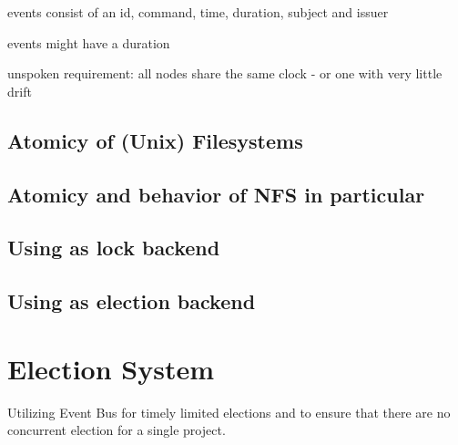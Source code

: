 events consist of an id, command, time, duration, subject and issuer

events might have a duration

unspoken requirement: all nodes share the same clock - or one with very little drift

\subsection{Atomicy of (Unix) Filesystems}

\subsection{Atomicy and behavior of NFS in particular}

\subsection{Using as lock backend}

\subsection{Using as election backend}



\section{Election System}

Utilizing Event Bus for timely limited elections and to ensure that there are no concurrent election for a single project.

